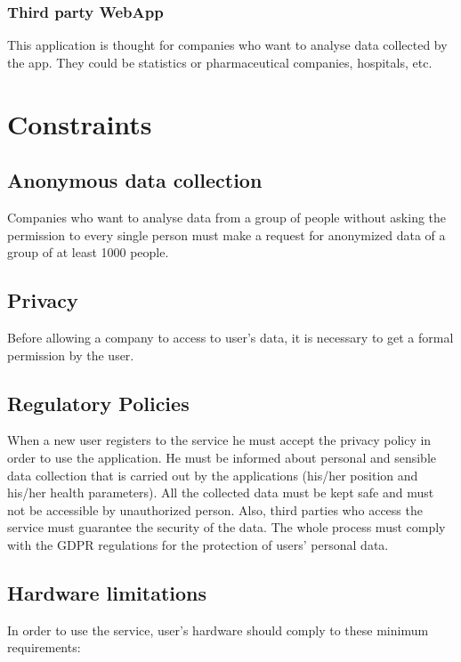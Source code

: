 \subsubsection{Third party WebApp}
This application is thought for companies who want to analyse data collected by the app. They could be statistics or pharmaceutical companies, hospitals, etc.

\section{Constraints}

\subsection{Anonymous data collection}
Companies who want to analyse data from a group of people without asking the permission to every single person must make a request for anonymized data of a group of at least 1000 people.

\subsection{Privacy}
Before allowing a company to access to user’s data, it is necessary to get a formal permission by the user.

\subsection{Regulatory Policies}
When a new user registers to the service he must accept the privacy policy in order to use the application.
He must be informed about personal and sensible data collection that is carried out by the applications (his/her position and his/her health parameters).
All the collected data must be kept safe and must not be accessible by unauthorized person.
Also, third parties who access the service must guarantee the security of the data.
The whole process must comply with the GDPR regulations for the protection of users' personal data.

\subsection{Hardware limitations}\label{hardwareLimitation}
In order to use the service, user’s hardware should comply to these minimum requirements:
